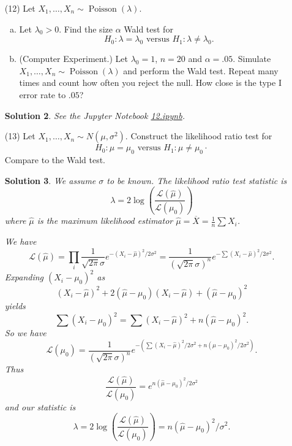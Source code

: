 \documentclass[10pt]{article}
\newtheorem*{sol}{Solution}
\newcommand{\Poiss}{\operatorname{Poisson}}
\begin{document}
\begin{enumerate}
\begin{enumerate}[(a)]
\item Test each drug versus the placebo at the 5 per cent level. Also, report
the estimated odds-ratios. Summarize your findings.
\item Use the Bonferroni and the FDR method to adjust for multiple testing.
(Beecher (1959)).
\end{enumerate}

\begin{sol}
See the Jupyter Notebook
\href{https://github.com/ajrasmus/some_of_statistics/blob/main/chapter_10/11.ipynb}{11.ipynb}.
\end{sol}

\item[(12)] Let $X_1,\ldots,X_n \sim \Poiss(\lambda)$.
\begin{enumerate}[(a)]
\item Let $\lambda_0>0$. Find the size $\alpha$ Wald test for
\[
H_0:\lambda=\lambda_0 \text{ versus } H_1:\lambda \neq \lambda_0.
\]

\item (Computer Experiment.) Let $\lambda_0=1$, $n = 20$ and $\alpha = .05$.
Simulate $X_1,\ldots,X_n \sim \Poiss(\lambda)$ and perform the Wald test.
Repeat many times and count how often you reject the null.
How close is the type I error rate to $.05$?
\end{enumerate}

\begin{sol}
See the Jupyter Notebook
\href{https://github.com/ajrasmus/some_of_statistics/blob/main/chapter_10/12.ipynb}{12.ipynb}.
\end{sol}

\item[(13)] Let $X_1,\ldots,X_n \sim N(\mu,\sigma^2)$.
Construct the likelihood ratio test for
\[
H_0: \mu=\mu_0 \text{ versus } H_1: \mu \neq \mu_0·
\]
Compare to the Wald test.

\begin{sol}
We assume $\sigma$ to be known.
The likelihood ratio test statistic is
\[
\lambda = 2 \log \left( \frac{\mathcal L(\hat\mu)}{\mathcal L(\mu_0)}\right)
\]
where $\hat \mu$ is the maximum likelihood estimator
$\hat \mu = \overline X = \frac{1}{n}\sum X_i$.

We have
\[
\mathcal L(\hat\mu) = \prod_i \frac{1}{\sqrt{2\pi}\sigma}e^{-(X_i-\hat\mu)^2/2\sigma^2}
= \frac{1}{(\sqrt{2\pi}\sigma)^n}e^{-\sum(X_i-\hat\mu)^2/2\sigma^2}.
\]
Expanding $(X_i-\mu_0)^2$ as
\[
(X_i-\hat\mu)^2+2(\hat\mu-\mu_0)(X_i-\hat\mu) +(\hat\mu-\mu_0)^2
\]
yields
\[
\sum (X_i-\mu_0)^2 = \sum (X_i-\hat \mu)^2 + n(\hat\mu -\mu_0)^2.
\]
So we have
\[
\mathcal L(\mu_0) =
\frac{1}{(\sqrt{2\pi}\sigma)^n} e^{-\left(\sum (X_i-\hat\mu)^2/2\sigma^2 +
n(\hat\mu-\mu_0)^2/2\sigma^2\right)}.
\]
Thus
\[
\frac{\mathcal L(\hat\mu)}{\mathcal L(\mu_0)}=e^{n(\hat\mu-\mu_0)^2/2\sigma^2}
\]
and our statistic is
\[
\lambda = 2 \log \left( \frac{\mathcal L(\hat\mu)}{\mathcal L(\mu_0)}\right)=
n(\hat\mu-\mu_0)^2/\sigma^2.
\]


\end{sol}
\end{enumerate}
\end{document}
